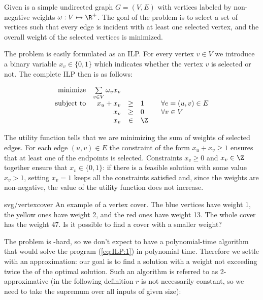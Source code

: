 \begin{framed}
  \begin{dfn}
    \label{dfn:minvcover}
    Given is a simple undirected graph $G=(V,E)$ with vertices labeled by non-negative weights
    $\omega:V\mapsto\R^+$.
    The goal of the problem  \minvcover  is to select a set of vertices such that every edge is 
    incident with at least one selected vertex, and the overall weight of the selected vertices is
    minimized.
\end{dfn}
\end{framed}



\noindent 
The problem is easily formulated as an ILP.
For every vertex $v\in V$ we introduce a binary variable $x_v\in\{0,1\}$ which  
indicates whether the vertex $v$ is selected or not. The complete ILP then is as follows:

\begin{equation}
\label{eq:ILP:1}
\begin{array}{rrcll}
  {\rm minimize}     & \multicolumn{1}{l}{\sum\limits_{v\in V}\omega_vx_v}\\
  {\rm subject\ to} & x_u + x_v&\ge&1& \;\;\;\forall e=(u,v)\in E\\
                          & x_v&\ge&0& \;\;\;\forall v\in V\\
                          & x_v&\in&\Z
\end{array}
\end{equation}

\noindent
The utility function tells that we are minimizing the sum of weights of selected edges. 
For each edge  $(u,v)\in E$ the constraint of the form  $x_u+x_v\ge 1$ 
ensures that at least one of the endpoints is selected. Constraints $x_v\ge0$ and $x_v\in\Z$
together ensure that   $x_v\in\{0,1\}$: if there is a feasible solution with some value $x_v>1$,
setting $x_v=1$ keeps all the constraints satisfied and, since the weights are non-negative, the
value of the utility function does not increase.


\begin{myfig}{0.8\textwidth}{svg/vertexcover}
  An example of a vertex cover. The blue vertices have weight 1, the yellow ones have weight 2, and the
  red ones have weight 13. The whole cover has the weight $47$. Is it possible to find a cover with a smaller 
  weight?
\end{myfig}


The problem \minvcover is \NP-hard, so we don't expect to have a polynomial-time algorithm that 
would solve the program (\ref{eq:ILP:1}) in polynomial time. Therefore we settle with an approximation:
our goal is to find a solution with a weight not exceeding twice the of the optimal solution. Such an algorithm
is referred to as 2-approximative (in the following definition $r$ is not necessarily constant, so we need to
take the supremum over all inputs of given size):


